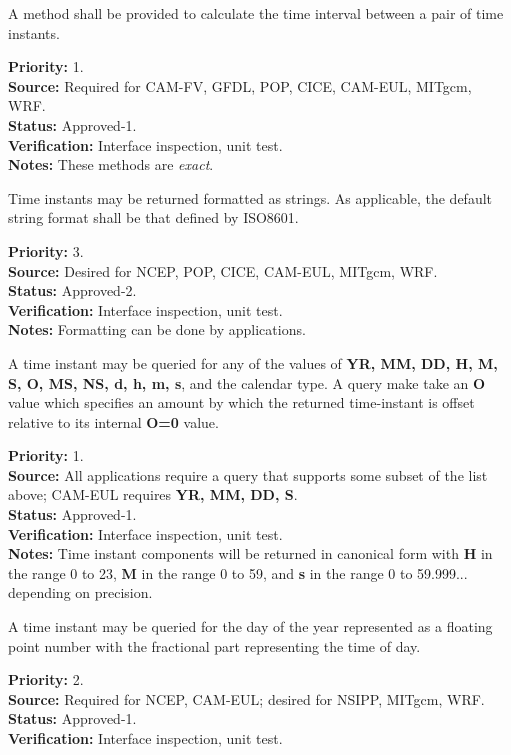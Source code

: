 A method shall be provided to calculate the time interval between a pair 
of time instants.
\begin{reqlist}
{\bf Priority:} 1. \\
{\bf Source:} Required for CAM-FV, GFDL, POP, CICE, CAM-EUL, MITgcm, WRF. \\
{\bf Status:} Approved-1. \\
{\bf Verification:} Interface inspection, unit test. \\
{\bf Notes:} These methods are {\em exact}.
\end{reqlist}

Time instants may be returned formatted as strings.  As applicable, the default string format shall be that defined by ISO8601.
\begin{reqlist}
{\bf Priority:} 3. \\
{\bf Source:} Desired for NCEP, POP, CICE, CAM-EUL, MITgcm, WRF. \\
{\bf Status:} Approved-2. \\
{\bf Verification:} Interface inspection, unit test. \\
{\bf Notes:} Formatting can be done by applications.
\end{reqlist}


A time instant may be queried for any of the values of 
{\bf YR, MM, DD, H, M, S, O, MS, NS, d, h, m, s},
and the calendar type. A query make take an {\bf O} value
which specifies an amount by which the returned time-instant
is offset relative to its internal {\bf O=0} value.
\begin{reqlist}
{\bf Priority:} 1. \\
{\bf Source:} All applications require a query that supports some subset of the
list above;
CAM-EUL requires {\bf YR, MM, DD, S}. \\
{\bf Status:} Approved-1. \\
{\bf Verification:} Interface inspection, unit test. \\
{\bf Notes:} Time instant components will be returned in canonical
form with {\bf H} in the range 0 to 23, {\bf M} in the range 0 to 59, and
{\bf s} in the range 0 to 59.999... depending on precision.
\end{reqlist}

A time instant may be queried for the day of the year represented as a 
floating point number with the fractional part representing the time of day.
\begin{reqlist}
{\bf Priority:} 2. \\
{\bf Source:} Required for NCEP, CAM-EUL; desired for NSIPP, MITgcm, WRF. \\
{\bf Status:} Approved-1. \\
{\bf Verification:} Interface inspection, unit test. 
\end{reqlist}

